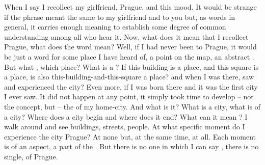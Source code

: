 \pa\label{Prague} When I say  I
recollect my girlfriend, Prague, and this mood.  It would be strange if the
phrase meant the same to my girlfriend and to you but, as words in general, it
carries enough meaning to establish some degree of common understanding among
all who hear it.  Now, what does it mean that I recollect Prague, what does the
word  mean? Well, if I had never been to Prague, it would be just a
word for some place I have heard of, a point on the map, an abstract
. But what , which place? What is a ? If this
building is a place, and this square is a place, is also
this-building-and-this-square a place? and when I was there, saw and experienced
the city? Even more, if I was born there and it was the first city I ever saw.
It did not happen at any point, it simply took time to develop -- not the
concept, but -- the  of my home-city. And what is it? What is a
city, what is  of a city?  Where does a city begin and where
does it end?  What can it mean ? I walk around and see
buildings, streets, people. At what specific moment do I experience the city
Prague? At none but, at the same time, at all. Each moment is 
of an aspect, a part of the . But there is no one in which
I can say , there is no single,
 of Prague.

